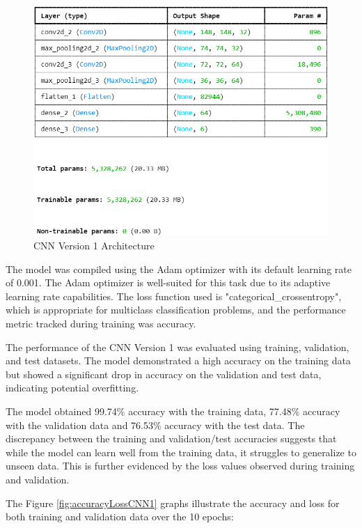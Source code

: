 \documentclass[conference]{IEEEtran}
\begin{document}
\begin{figure}[H]
    \centering
    \includegraphics[width=1\linewidth]{images/cnn_arch_1.png}
    \caption{CNN Version 1 Architecture}
    \label{fig:cnnArch1}
\end{figure}

The model was compiled using the Adam optimizer with its default learning rate of 0.001. The Adam optimizer is well-suited for this task due to its adaptive learning rate capabilities. The loss function used is "categorical\_crossentropy", which is appropriate for multiclass classification problems, and the performance metric tracked during training was accuracy.

The performance of the CNN Version 1 was evaluated using training, validation, and test datasets. The model demonstrated a high accuracy on the training data but showed a significant drop in accuracy on the validation and test data, indicating potential overfitting.

The model obtained 99.74\% accuracy with the training data, 77.48\% accuracy with the validation data and 76.53\% accuracy with the test data. The discrepancy between the training and validation/test accuracies suggests that while the model can learn well from the training data, it struggles to generalize to unseen data. This is further evidenced by the loss values observed during training and validation.

The Figure \ref{fig:accuracyLossCNN1} graphs illustrate the accuracy and loss for both training and validation data over the 10 epochs:
\end{document}

